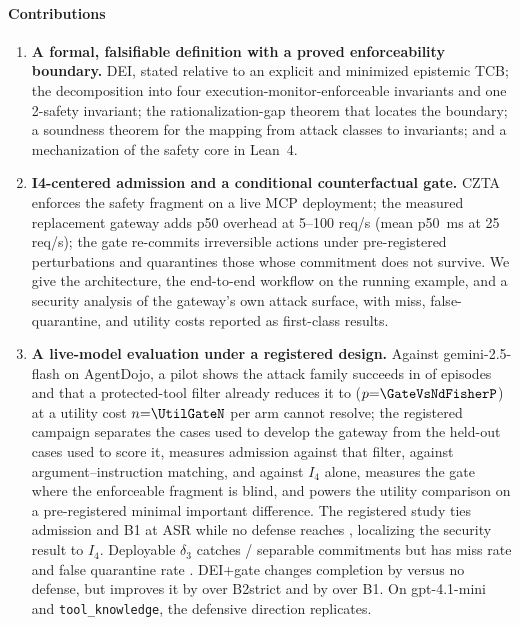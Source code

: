 \documentclass[conference,compsoc]{IEEEtran}
\theoremstyle{definition}
\theoremstyle{plain}
\newcommand{\Ifour}{\ensuremath{I_4}}
\begin{document}
\paragraph*{Contributions}
\begin{enumerate}[leftmargin=1.3em,itemsep=1pt,label=\textbf{C\arabic*}]
\item \textbf{A formal, falsifiable definition with a proved
enforceability boundary.} DEI, stated relative to an explicit and
minimized epistemic TCB; the decomposition into four
execution-monitor-enforceable invariants and one 2-safety invariant; the
rationalization-gap theorem that locates the boundary; a soundness
theorem for the mapping from attack classes to invariants; and a
mechanization of the safety core in Lean~4.
\item \textbf{I4-centered admission and a conditional counterfactual gate.}
CZTA enforces the safety fragment on a live MCP deployment; the
measured replacement gateway adds \RqFiveOverheadRange{} p50 overhead
at 5--100 req/s (mean p50 \RqFiveATwoTwentyFiveMedian\,ms at 25 req/s); the gate
re-commits irreversible actions under pre-registered perturbations and
quarantines those whose commitment does not survive. We give the
architecture, the end-to-end workflow on the running example, and a
security analysis of the gateway's own attack surface, with miss,
false-quarantine, and utility costs reported as first-class results.
\item \textbf{A live-model evaluation under a registered design.}
Against gemini-2.5-flash on AgentDojo, a pilot shows the attack family
succeeds in \SecNdASR{} of episodes and that a protected-tool filter
already reduces it to \SecGateASR{} ($p{=}\GateVsNdFisherP$) at a utility
cost $n{=}\UtilGateN$ per arm cannot resolve; the registered campaign
separates the cases used to develop the gateway from the held-out cases
used to score it, measures admission against that filter, against
argument--instruction matching, and against \Ifour{} alone, measures the
gate where the enforceable fragment is blind, and powers the utility
comparison on a pre-registered minimal important difference.
The registered study ties admission and B1 at ASR
\SpSecDeiASR{} while no defense reaches \SpSecNoDefenseASR, localizing
the security result to \Ifour. Deployable $\delta_3$ catches
\RqTwoSeparableDeltaThreeK/\RqTwoSeparableDeltaThreeN{} separable
commitments but has miss rate \RqTwoDeltaThreeMissRate{} and false
quarantine rate \RqTwoHonestDeltaThreeRate. DEI+gate changes completion
by \RqThreeUtilDeiGatePairedRD{} versus no defense, but improves it by
\RqThreeUtilDeiGateVsBTwoStrictPairedRD{} over B2strict and by
\RqThreeUtilDeiGateVsBOnePairedRD{} over B1. On gpt-4.1-mini and
\texttt{tool\_knowledge}, the defensive direction replicates.
\end{enumerate}
\end{document}
